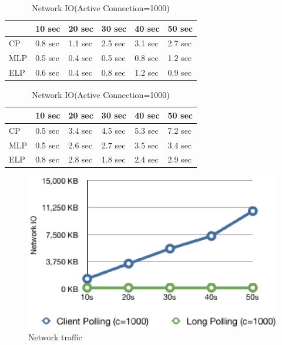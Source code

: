\begin{table}
\centering \caption{\label{tb:traffic} Network IO(Active Connection=1000)}
\begin{tabular}{|l|l|l|l|l|l|}
    \hline & 10 sec & 20 sec & 30 sec & 40 sec & 50 sec \\
    \hline CP & 0.8 sec & 1.1 sec & 2.5 sec & 3.1 sec & 2.7 sec \\
    \hline MLP & 0.5 sec & 0.4 sec & 0.5 sec & 0.8 sec & 1.2 sec \\
    \hline ELP & 0.6 sec & 0.4 sec & 0.8 sec & 1.2 sec & 0.9 sec \\
    \hline
\end{tabular}
\end{table}

\begin{table}
\centering \caption{\label{tb:traffic} Network IO(Active Connection=1000)}
\begin{tabular}{|l|l|l|l|l|l|}
    \hline  & 10 sec & 20 sec & 30 sec & 40 sec & 50 sec \\
    \hline CP & 0.5 sec & 3.4 sec & 4.5 sec & 5.3 sec & 7.2 sec \\
    \hline MLP & 0.5 sec & 2.6 sec & 2.7 sec & 3.5 sec & 3.4 sec \\
    \hline ELP & 0.8 sec & 2.8 sec & 1.8 sec & 2.4 sec & 2.9 sec \\
    \hline
\end{tabular}
\end{table}

\begin{figure}[htb!]
\centering%
    \includegraphics[scale=0.60]{figures/io.eps}
    \caption{Network traffic}
    \label{fig:traffic_io}
\end{figure}

